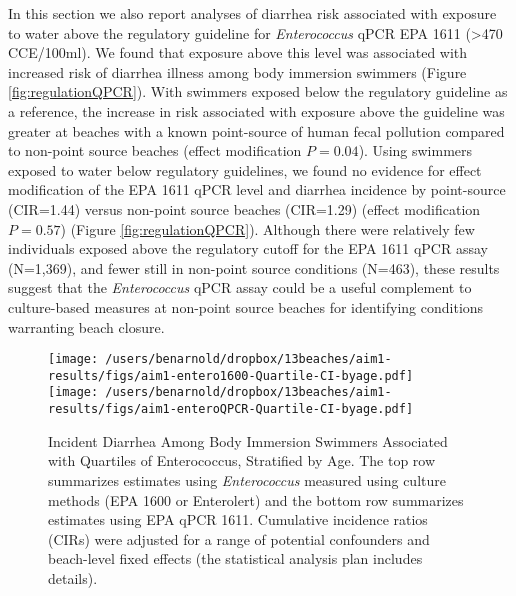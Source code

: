 \documentclass[12pt]{article}\usepackage[]{graphicx}\usepackage[]{color}
\begin{document}
In this section we also report analyses of diarrhea risk associated with exposure to water above the regulatory guideline for \textit{Enterococcus} qPCR EPA 1611 (>470 CCE/100ml).  We found that exposure above this level was associated with increased risk of diarrhea illness among body immersion swimmers (Figure \ref{fig:regulationQPCR}).  With swimmers exposed below the regulatory guideline as a reference, the increase in risk associated with exposure above the guideline was greater at beaches with a known point-source of human fecal pollution compared to non-point source beaches (effect modification $P=0.04$). Using swimmers exposed to water below regulatory guidelines, we found no evidence for effect modification of the EPA 1611 qPCR level and diarrhea incidence by point-source (CIR=1.44) versus non-point source beaches (CIR=1.29) (effect modification $P=0.57$) (Figure \ref{fig:regulationQPCR}).  Although there were relatively few individuals exposed above the regulatory cutoff for the EPA 1611 qPCR assay (N=1,369), and fewer still in non-point source conditions (N=463), these results suggest that the \textit{Enterococcus} qPCR assay could be a useful complement to culture-based measures at non-point source beaches for identifying conditions warranting beach closure.


\begin{landscape}
\begin{figure}
\begin{center}
\texttt{[image: /users/benarnold/dropbox/13beaches/aim1-results/figs/aim1-entero1600-Quartile-CI-byage.pdf]} \\
\texttt{[image: /users/benarnold/dropbox/13beaches/aim1-results/figs/aim1-enteroQPCR-Quartile-CI-byage.pdf]}
\caption{Incident Diarrhea Among Body Immersion Swimmers Associated with Quartiles of Enterococcus, Stratified by Age. The top row summarizes estimates using \textit{Enterococcus} measured using culture methods (EPA 1600 or Enterolert) and the bottom row summarizes estimates using EPA qPCR 1611.  Cumulative incidence ratios (CIRs) were adjusted for a range of potential confounders and beach-level fixed effects (the statistical analysis plan includes details).   \label{fig:enteroage}}
\end{center}
\end{figure}
\end{landscape}
\end{document}
